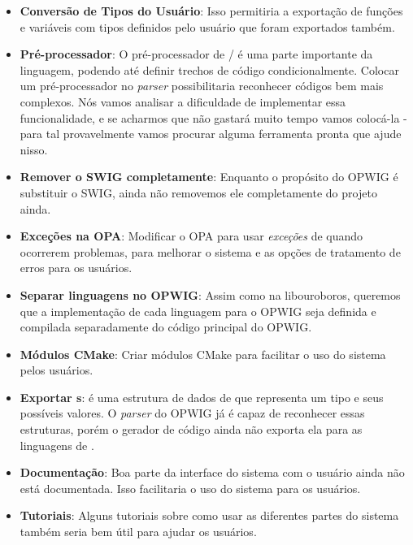 \begin{itemize}
  \item \textbf{Conversão de Tipos do Usuário}: Isso permitiria a exportação de
    funções e variáveis com tipos definidos pelo usuário que foram exportados também.
  \item \textbf{Pré-processador}: O pré-processador de \C{}/\CXX{} é uma parte 
    importante da linguagem, podendo até definir trechos de código condicionalmente.
    Colocar um pré-processador no \textit{parser} possibilitaria reconhecer
    códigos \CXX{} bem mais complexos. Nós vamos analisar a dificuldade de implementar
    essa funcionalidade, e se acharmos que não gastará muito tempo vamos colocá-la -
    para tal provavelmente vamos procurar alguma ferramenta pronta que ajude nisso.
  \item \textbf{Remover o SWIG completamente}: Enquanto o propósito do OPWIG é substituir
    o SWIG, ainda não removemos ele completamente do projeto ainda.
  \item \textbf{Exceções na OPA}: Modificar o OPA para usar \textit{exceções} de \CXX{}
    quando ocorrerem problemas, para melhorar o sistema e as opções de tratamento de
    erros para os usuários.
  \item \textbf{Separar linguagens no OPWIG}: Assim como na libouroboros, queremos que
    a implementação de cada linguagem para o OPWIG seja definida e compilada separadamente
    do código principal do OPWIG.
  \item \textbf{Módulos CMake}: Criar módulos CMake para facilitar o uso do sistema
    pelos usuários.
  \item \textbf{Exportar s}:  é uma estrutura de dados de \CXX{} 
    que representa um tipo e seus possíveis valores. O \textit{parser} do OPWIG já
    é capaz de reconhecer essas estruturas, porém o gerador de código ainda não
    exporta ela para as linguagens de \script{}.
  \item \textbf{Documentação}: Boa parte da interface do sistema com o usuário ainda
    não está documentada. Isso facilitaria o uso do sistema para os usuários.
  \item \textbf{Tutoriais}: Alguns tutoriais sobre como usar as diferentes partes do
    sistema também seria bem útil para ajudar os usuários.
\end{itemize}
